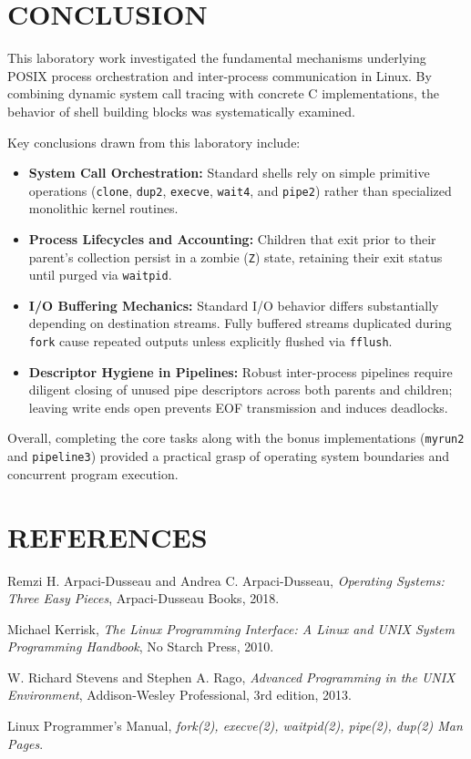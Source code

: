 \documentclass[12pt,a4paper]{report}
\numberwithin{equation}{chapter}
\numberwithin{figure}{chapter}
\numberwithin{table}{chapter}
\begin{document}
\chapter*{CONCLUSION}
This laboratory work investigated the fundamental mechanisms underlying POSIX process orchestration and inter-process communication in Linux. By combining dynamic system call tracing with concrete C implementations, the behavior of shell building blocks was systematically examined.

Key conclusions drawn from this laboratory include:
\begin{itemize}
    \item \textbf{System Call Orchestration:} Standard shells rely on simple primitive operations (\texttt{clone}, \texttt{dup2}, \texttt{execve}, \texttt{wait4}, and \texttt{pipe2}) rather than specialized monolithic kernel routines.
    \item \textbf{Process Lifecycles and Accounting:} Children that exit prior to their parent's collection persist in a zombie (\texttt{Z}) state, retaining their exit status until purged via \texttt{waitpid}.
    \item \textbf{I/O Buffering Mechanics:} Standard I/O behavior differs substantially depending on destination streams. Fully buffered streams duplicated during \texttt{fork} cause repeated outputs unless explicitly flushed via \texttt{fflush}.
    \item \textbf{Descriptor Hygiene in Pipelines:} Robust inter-process pipelines require diligent closing of unused pipe descriptors across both parents and children; leaving write ends open prevents EOF transmission and induces deadlocks.
\end{itemize}

Overall, completing the core tasks along with the bonus implementations (\texttt{myrun2} and \texttt{pipeline3}) provided a practical grasp of operating system boundaries and concurrent program execution.

\chapter*{REFERENCES}

\noindent [1] Remzi H. Arpaci-Dusseau and Andrea C. Arpaci-Dusseau, \textit{Operating Systems: Three Easy Pieces}, Arpaci-Dusseau Books, 2018.

\noindent [2] Michael Kerrisk, \textit{The Linux Programming Interface: A Linux and UNIX System Programming Handbook}, No Starch Press, 2010.

\noindent [3] W. Richard Stevens and Stephen A. Rago, \textit{Advanced Programming in the UNIX Environment}, Addison-Wesley Professional, 3rd edition, 2013.

\noindent [4] Linux Programmer's Manual, \textit{fork(2), execve(2), waitpid(2), pipe(2), dup(2) Man Pages}.
\end{document}
